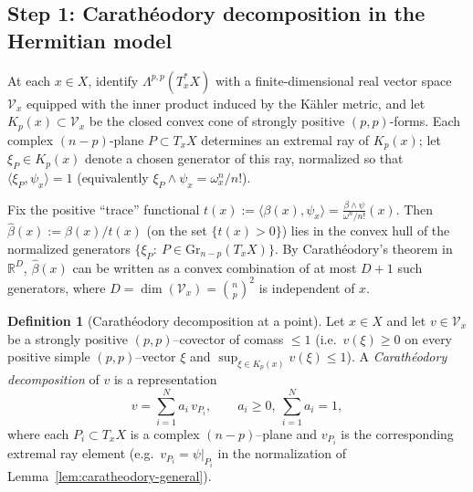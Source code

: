 \documentclass[11pt]{article}
\newcommand{\REVMZ}[1]{\textcolor{teal}{#1}}  %
\numberwithin{equation}{section}  %
\theoremstyle{plain}
\theoremstyle{definition}
\newtheorem{definition}[theorem]{Definition}
\theoremstyle{remark}
\newcommand{\R}{\mathbb{R}}
\newcommand{\Gr}{\mathrm{Gr}}
\begin{document}

\subsection*{Step 1: Carath\'eodory decomposition in the Hermitian model}

At each $x\in X$, identify $\Lambda^{p,p}(T_x^*X)$ with a finite-dimensional
real vector space $\mathcal{V}_x$ equipped with the inner product induced by
the K\"ahler metric, and let $K_p(x)\subset \mathcal{V}_x$ be the closed convex
cone of strongly positive $(p,p)$-forms.
Each complex $(n-p)$-plane $P\subset T_xX$ determines an extremal ray of $K_p(x)$;
let $\xi_P\in K_p(x)$ denote a chosen generator of this ray, normalized so that
$\langle \xi_P,\psi_x\rangle=1$ (equivalently $\xi_P\wedge\psi_x=\omega_x^n/n!$).

Fix the positive ``trace'' functional $t(x):=\langle \beta(x),\psi_x\rangle=\frac{\beta\wedge\psi}{\omega^n/n!}(x)$.
Then $\widehat\beta(x):=\beta(x)/t(x)$ (on the set $\{t(x)>0\}$) lies in the convex
hull of the normalized generators $\{\xi_P:\ P\in \Gr_{n-p}(T_xX)\}$.
By Carath\'eodory's theorem \REVMZ{\cite{Schneider14}} in $\R^{D}$, $\widehat\beta(x)$ can be written as a convex
combination of at most $D+1$ such generators, where $D=\dim(\mathcal{V}_x)=\binom{n}{p}^2$
is independent of $x$.






\begin{definition}[Carath\'eodory decomposition at a point]\label{def:caratheodory-decomp}
Let $x\in X$ and let $v\in \mathcal V_x$ be a strongly positive $(p,p)$--covector of comass $\le 1$
(i.e.\ $v(\xi)\ge 0$ on every positive simple $(p,p)$--vector $\xi$ and $\sup_{\xi\in K_p(x)} v(\xi)\le 1$).
A \emph{Carath\'eodory decomposition} of $v$ is a representation
\[
v=\sum_{i=1}^N a_i\, v_{P_i},
\qquad
a_i\ge 0,\ \sum_{i=1}^N a_i=1,
\]
where each $P_i\subset T_xX$ is a complex $(n-p)$--plane and $v_{P_i}$ is the corresponding extremal ray element
(e.g.\ $v_{P_i}=\psi|_{P_i}$ in the normalization of Lemma~\ref{lem:caratheodory-general}).
\end{definition}
\end{document}
